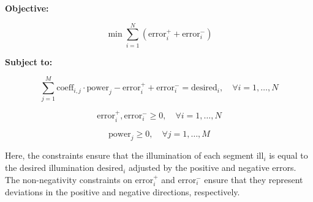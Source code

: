 \documentclass{article}
\begin{document}
\textbf{Objective:}

\[
\min \sum_{i=1}^{N} ( \text{error}_i^+ + \text{error}_i^- )
\]

\textbf{Subject to:}

\[
\sum_{j=1}^{M} \text{coeff}_{i,j} \cdot \text{power}_j - \text{error}_i^+ + \text{error}_i^- = \text{desired}_i, \quad \forall i = 1, \ldots, N
\]

\[
\text{error}_i^+, \text{error}_i^- \geq 0, \quad \forall i = 1, \ldots, N
\]

\[
\text{power}_j \geq 0, \quad \forall j = 1, \ldots, M
\]

Here, the constraints ensure that the illumination of each segment \(\text{ill}_i\) is equal to the desired illumination \(\text{desired}_i\) adjusted by the positive and negative errors. The non-negativity constraints on \(\text{error}_i^+\) and \(\text{error}_i^-\) ensure that they represent deviations in the positive and negative directions, respectively.
\end{document}
